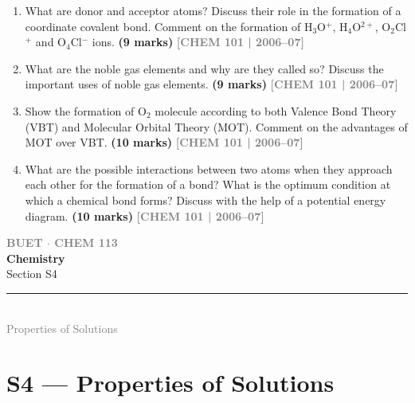 \documentclass[12pt,a3paper]{article}
\newcommand{\yr}[1]{\hfill\textcolor{gray}{\small\textbf{[#1]}}}
\newcommand{\mk}[1]{\textcolor{orange!70!black}{\small\textbf{(#1 marks)}}}
\newcommand{\secdivider}[4]{%
  \newpage\thispagestyle{empty}%
  \vspace*{\fill}%
  \begin{tcolorbox}[enhanced,colback=#4!7,colframe=#3,boxrule=1.5pt,arc=8pt,
    left=20pt,right=20pt,top=22pt,bottom=22pt,
    shadow={3pt}{-3pt}{0pt}{black!15}]
    \centering
    {\large\textcolor{gray}{\textbf{BUET $\cdot$ CHEM 113}}}\\[8pt]
    {\fontsize{26}{32}\selectfont\bfseries\textcolor{#3}{Chemistry}}\\[6pt]
    {\fontsize{15}{19}\selectfont\textcolor{dgray}{#1}}\\[12pt]
    \textcolor{#3!60}{\rule{0.5\textwidth}{0.5pt}}\\[6pt]
    {\small\textcolor{gray}{#2}}
  \end{tcolorbox}%
  \vspace*{\fill}\newpage%
}
\begin{document}
\begin{enumerate}
\item What are donor and acceptor atoms? Discuss their role in the formation of a coordinate covalent bond. Comment on the formation of H$_3$O$^+$, H$_4$O$^{2+}$, O$_2$Cl$^+$ and O$_4$Cl$^-$ ions. \mk{9}
\yr{CHEM 101 | 2006--07}



\item What are the noble gas elements and why are they called so? Discuss the important uses of noble gas elements. \mk{9}
\yr{CHEM 101 | 2006--07}



\item Show the formation of O$_2$ molecule according to both Valence Bond Theory (VBT) and Molecular Orbital Theory (MOT). Comment on the advantages of MOT over VBT. \mk{10}
\yr{CHEM 101 | 2006--07}



\item What are the possible interactions between two atoms when they approach each other for the formation of a bond? What is the optimum condition at which a chemical bond forms? Discuss with the help of a potential energy diagram. \mk{10}
\yr{CHEM 101 | 2006--07}



\end{enumerate}
\newpage


\secdivider{Section S4}{Properties of Solutions}{cD}{cD}
\label{sec:S4}
\section{S4 --- Properties of Solutions}
\end{document}
